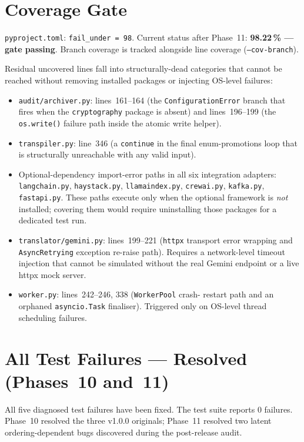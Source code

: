 \documentclass[12pt,a4paper,oneside]{report}
\newcommand{\fname}[1]{\texttt{#1}}          %
\newcommand{\code}[1]{\texttt{#1}}           %
\begin{document}
\section{Coverage Gate}

\fname{pyproject.toml}: \code{fail\_under = 98}.  Current status after
Phase~11: \textbf{98.22\,\% --- gate passing}.  Branch coverage is tracked
alongside line coverage (\code{--cov-branch}).

Residual uncovered lines fall into structurally-dead categories that
cannot be reached without removing installed packages or injecting OS-level
failures:
\begin{itemize}
  \item \fname{audit/archiver.py}: lines~161--164 (the
        \code{ConfigurationError} branch that fires when the
        \code{cryptography} package is absent) and lines~196--199 (the
        \code{os.write()} failure path inside the atomic write helper).
  \item \fname{transpiler.py}: line~346 (a \code{continue} in the final
        enum-promotions loop that is structurally unreachable with any
        valid input).
  \item Optional-dependency import-error paths in all six integration
        adapters: \fname{langchain.py}, \fname{haystack.py},
        \fname{llamaindex.py}, \fname{crewai.py},
        \fname{kafka.py}, \fname{fastapi.py}.
        These paths execute only when the optional framework is \emph{not}
        installed; covering them would require uninstalling those packages
        for a dedicated test run.
  \item \fname{translator/gemini.py}: lines~199--221 (\code{httpx} transport
        error wrapping and \code{AsyncRetrying} exception re-raise path).
        Requires a network-level timeout injection that cannot be simulated
        without the real Gemini endpoint or a live httpx mock server.
  \item \fname{worker.py}: lines~242--246, 338 (\code{WorkerPool} crash-
        restart path and an orphaned \code{asyncio.Task} finaliser).
        Triggered only on OS-level thread scheduling failures.
\end{itemize}

\section{All Test Failures --- Resolved (Phases~10 and~11)}

All five diagnosed test failures have been fixed.  The test suite reports 0
failures.  Phase~10 resolved the three v1.0.0 originals; Phase~11 resolved two
latent ordering-dependent bugs discovered during the post-release audit.
\end{document}
